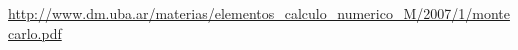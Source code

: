 \begin{thebibliography}{9}
  
\url{http://www.dm.uba.ar/materias/elementos_calculo_numerico_M/2007/1/montecarlo.pdf}

\end{thebibliography}
